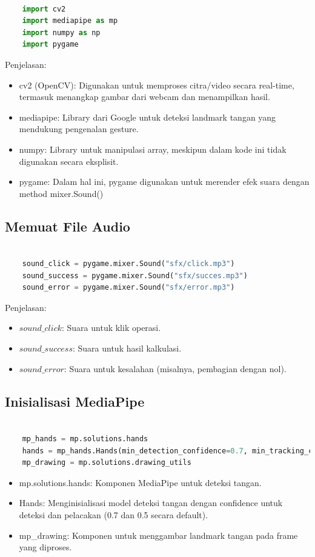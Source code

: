 \documentclass[11pt,a4paper]{article}
\begin{document}
    \begin{lstlisting}[language=Python, caption=Library yang Digunakan]
    
    import cv2
    import mediapipe as mp
    import numpy as np
    import pygame
    \end{lstlisting}
    Penjelasan:
    \begin{itemize}
    \item cv2 (OpenCV): Digunakan untuk memproses citra/video secara real-time, termasuk menangkap gambar dari webcam dan menampilkan hasil.
    \item mediapipe: Library dari Google untuk deteksi landmark tangan yang mendukung pengenalan gesture.
    \item numpy: Library untuk manipulasi array, meskipun dalam kode ini tidak digunakan secara eksplisit.
    \item pygame: Dalam hal ini, pygame digunakan untuk merender efek suara dengan method mixer.Sound()
    \end{itemize}

    \subsection{Memuat File Audio}
    \begin{lstlisting}[language=Python, caption=Memuat File Audio]
        
    sound_click = pygame.mixer.Sound("sfx/click.mp3")
    sound_success = pygame.mixer.Sound("sfx/succes.mp3")
    sound_error = pygame.mixer.Sound("sfx/error.mp3")
    \end{lstlisting}
    Penjelasan:
    \begin{itemize}
        \item $sound\_click$: Suara untuk klik operasi.
        \item $sound\_success$: Suara untuk hasil kalkulasi.
        \item $sound\_error$: Suara untuk kesalahan (misalnya, pembagian dengan nol).
    \end{itemize}

    \subsection{Inisialisasi MediaPipe}
    \begin{lstlisting}[language=Python, caption=Inisialisasi Mediapipe]
    
    mp_hands = mp.solutions.hands
    hands = mp_hands.Hands(min_detection_confidence=0.7, min_tracking_confidence=0.5)
    mp_drawing = mp.solutions.drawing_utils
    \end{lstlisting}
    \begin{itemize}
        \item mp.solutions.hands: Komponen MediaPipe untuk deteksi tangan.
        \item Hands: Menginisialisasi model deteksi tangan dengan confidence untuk deteksi dan pelacakan (0.7 dan 0.5 secara default).
        \item mp\_drawing: Komponen untuk menggambar landmark tangan pada frame yang diproses.
    \end{itemize}
\end{document}
